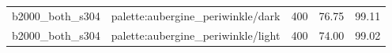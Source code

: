 \begin{longtable}{l>{\raggedright\arraybackslash}p{.42\linewidth}rrr}
b2000\_\allowbreak{}both\_\allowbreak{}s304 & %
palette:aubergine\_\allowbreak{}periwinkle/dark & %
400 & %
76.75 & %
99.11 \\ %

b2000\_\allowbreak{}both\_\allowbreak{}s304 & %
palette:aubergine\_\allowbreak{}periwinkle/light & %
400 & %
74.00 & %
99.02 \\ %


\end{longtable}
